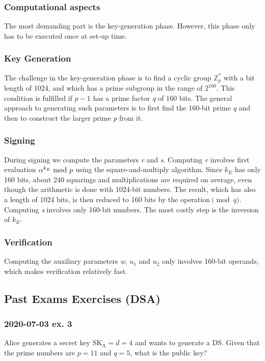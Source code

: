\subsubsection{Computational aspects}
The most demanding part is the key-generation phase. However, this phase only has to be executed once at set-up time.

\subsubsection*{Key Generation}
The challenge in the key-generation phase is to find a cyclic group $\mathbb{Z}_p^*$ with a bit length of 1024, and which has a prime subgroup in the range of $2^{160}$. This condition is fulfilled if $p-1$ has a prime factor \textit{q} of 160 bits. The general approach to generating such parameters is to first find the 160-bit prime \textit{q} and then to construct the larger prime \textit{p} from it.

\subsubsection*{Signing}
During signing we compute the parameters \textit{r} and \textit{s}. Computing \textit{r} involves first evaluation $\alpha^{k_E}\text{ mod } p$ using the square-and-multiply algorithm. Since $k_E$ has only 160 bits, about 240 squarings and multiplications are required on average, even though the arithmetic is done with 1024-bit numbers. The result, which has also a length of 1024 bits, is then reduced to 160 bits by the operation$\pmod q$. Computing \textit{s} involves only 160-bit numbers. The most costly step is the inversion of $k_E$.

\subsubsection*{Verification}
Computing the auxiliary parameters \textit{w}, $u_1$ and $u_2$ only involves 160-bit operands, which makes verification relatively fast.

\newpage
\subsection{Past Exams Exercises (DSA)}
\subsubsection{2020-07-03 ex. 3}
Alice generates a secret key $\text{SK}_{\text{A}}=d=4$ and wants to generate a DS. Given that the prime numbers are $p=11$ and $q=5$, what is the public key?

